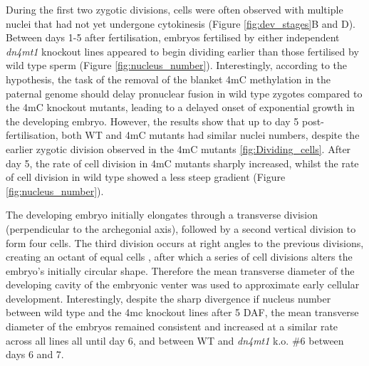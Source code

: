 During the first two zygotic divisions, cells were often observed with multiple nuclei that had not yet undergone cytokinesis (Figure \ref{fig:dev_stages}B and D). Between days 1-5 after fertilisation, embryos fertilised by either independent \textit{dn4mt1} knockout lines appeared to begin dividing earlier than those fertilised by wild type sperm (Figure \ref{fig:nucleus_number}). Interestingly, according to the hypothesis, the task of the removal of the blanket 4mC methylation in the paternal genome should delay pronuclear fusion in wild type zygotes compared to the 4mC knockout mutants, leading to a delayed onset of exponential growth in the developing embryo. However, the results show that up to day 5 post-fertilisation, both WT and 4mC mutants had similar nuclei numbers, despite the earlier zygotic division observed in the 4mC mutants \ref{fig:Dividing_cells}. After day 5, the rate of cell division in 4mC mutants sharply increased, whilst the rate of cell division in wild type showed a less steep gradient (Figure \ref{fig:nucleus_number}).

The developing embryo initially elongates through a transverse division (perpendicular to the archegonial axis), followed by a second vertical division to form four cells. The third division occurs at right angles to the previous divisions, creating an octant of equal cells \citep{RN143,RN144}, after which a series of cell divisions alters the embryo's initially circular shape. Therefore the mean transverse diameter of the developing cavity of the embryonic venter was used to approximate early cellular development. Interestingly, despite the sharp divergence if nucleus number between wild type and the 4mc knockout lines after 5 DAF, the mean transverse diameter of the embryos remained consistent and increased at a similar rate across all lines all until day 6, and between WT and \textit{dn4mt1} k.o. \#6 between days 6 and 7. 


